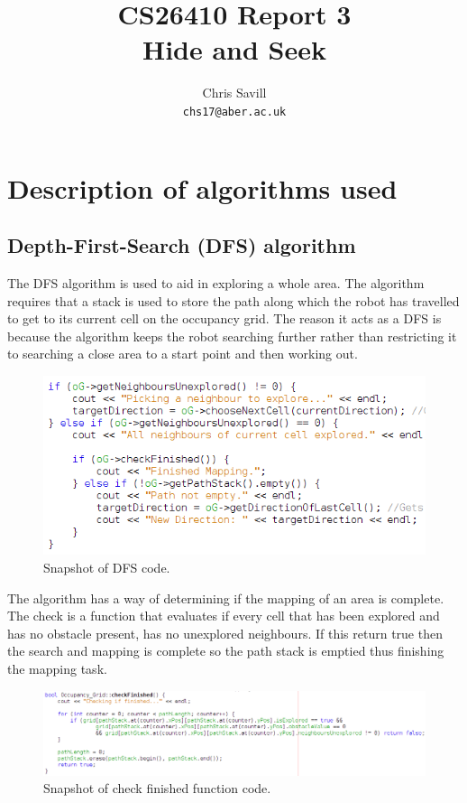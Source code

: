 \documentclass[a4paper,12pt]{article}
\title{CS26410 Report 3\\
Hide and Seek}
\author{Chris Savill\\\texttt{chs17@aber.ac.uk}}
\begin{document}
\maketitle
\newpage
\tableofcontents
\newpage

\section{Description of algorithms used}

\subsection{Depth-First-Search (DFS) algorithm}
\noindent The DFS algorithm is used to aid in exploring a whole area. The algorithm requires that a stack is used to store the path along which the robot has travelled to get to its current cell on the occupancy grid. The reason it acts as a DFS is because the algorithm keeps the robot searching further rather than restricting it to searching a close area to a start point and then working out.

\begin{figure}[H]
\includegraphics[scale=0.8]{DFS_SS.png}
\caption{Snapshot of DFS code.}
\end{figure}

\vspace{5mm}
\noindent The algorithm has a way of determining if the mapping of an area is complete. The check is a function that evaluates if every cell that has been explored and has no obstacle present, has no unexplored neighbours. If this return true then the search and mapping is complete so the path stack is emptied thus finishing the mapping task.

\begin{figure}[H]
\includegraphics[scale=0.55]{Check_Finished_SS.png}
\caption{Snapshot of check finished function code.}
\end{figure}
\end{document}
